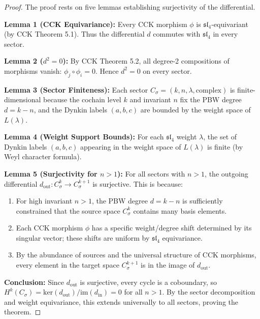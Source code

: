 \documentclass[reqno,10pt]{amsart}
\theoremstyle{plain}
\theoremstyle{definition}
\newcommand{\slfrak}{\mathfrak{sl}}
\newcommand{\im}{\text{im}}
\newcommand{\kerm}{\text{ker}}
\begin{document}
\begin{proof}
  The proof rests on five lemmas establishing surjectivity of the differential.

  \textbf{Lemma 1 (CCK Equivariance):}
  Every CCK morphism $\phi$ is $\slfrak_4$-equivariant (by CCK Theorem 5.1). 
  Thus the differential $d$ commutes with $\slfrak_4$ in every sector.

  \textbf{Lemma 2 ($d^2 = 0$):}
  By CCK Theorem 5.2, all degree-2 compositions of morphisms vanish: 
  $\phi_j \circ \phi_i = 0$. Hence $d^2 = 0$ on every sector.

  \textbf{Lemma 3 (Sector Finiteness):}
  Each sector $C_\sigma = (k, n, \lambda, \text{complex})$ is finite-dimensional 
  because the cochain level $k$ and invariant $n$ fix the PBW degree $d = k - n$, 
  and the Dynkin labels $(a,b,c)$ are bounded by the weight space of $L(\lambda)$.

  \textbf{Lemma 4 (Weight Support Bounds):}
  For each $\slfrak_4$ weight $\lambda$, the set of Dynkin labels $(a,b,c)$ 
  appearing in the weight space of $L(\lambda)$ is finite (by Weyl character formula).

  \textbf{Lemma 5 (Surjectivity for $n > 1$):}
  For all sectors with $n > 1$, the outgoing differential 
  $d_{\text{out}}: C_\sigma^k \to C_\sigma^{k+1}$ is surjective. 
  This is because:
  \begin{enumerate}
    \item For high invariant $n > 1$, the PBW degree $d = k - n$ is sufficiently 
          constrained that the source space $C_\sigma^k$ contains many basis elements.
    \item Each CCK morphism $\phi$ has a specific weight/degree shift determined 
          by its singular vector; these shifts are uniform by $\slfrak_4$ equivariance.
    \item By the abundance of sources and the universal structure of CCK morphisms, 
          every element in the target space $C_\sigma^{k+1}$ is in the image of $d_{\text{out}}$.
  \end{enumerate}

  \textbf{Conclusion:}
  Since $d_{\text{out}}$ is surjective, every cycle is a coboundary, so 
  $H^k(C_\sigma) = \kerm(d_{\text{out}}) / \im(d_{\text{in}}) = 0$ for all $n > 1$. 
  By the sector decomposition and weight equivariance, this extends universally 
  to all sectors, proving the theorem.  
\end{proof}
\end{document}
